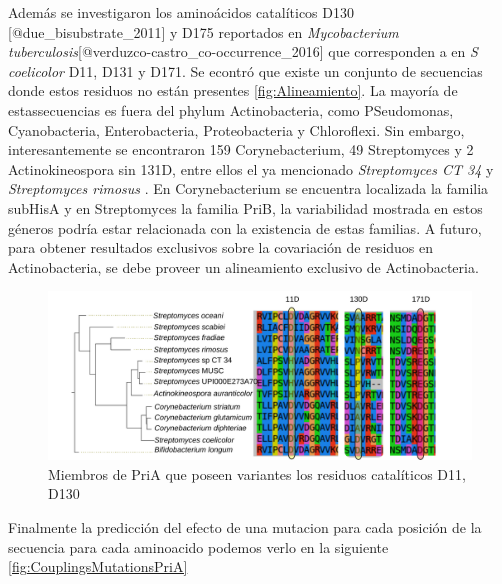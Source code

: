 \documentclass[]{article}
\begin{document}
{Además se investigaron los aminoácidos catalíticos D130
{[}@due\_bisubstrate\_2011{]} y D175 reportados en \emph{Mycobacterium
tuberculosis}{[}@verduzco-castro\_co-occurrence\_2016{]} que
corresponden a en \emph{S coelicolor} D11, D131 y D171. Se econtró que
existe un conjunto de secuencias donde estos residuos no están presentes
\autoref{fig:Alineamiento}. La mayoría de estassecuencias es fuera del
phylum Actinobacteria, como PSeudomonas, Cyanobacteria, Enterobacteria,
Proteobacteria y Chloroflexi. Sin embargo, interesantemente se
encontraron 159 Corynebacterium, 49 Streptomyces y 2 Actinokineospora
sin 131D, entre ellos el ya mencionado \emph{Streptomyces CT 34} y
\emph{Streptomyces rimosus} . En Corynebacterium se encuentra localizada
la familia subHisA y en Streptomyces la familia PriB, la variabilidad
mostrada en estos géneros podría estar relacionada con la existencia de
estas familias. A futuro, para obtener resultados exclusivos sobre la
covariación de residuos en Actinobacteria, se debe proveer un
alineamiento exclusivo de Actinobacteria.

\begin{figure}[h!tbp]
\centering
\includegraphics[angle = 0,scale = .5]{chapter4/Couplings/HIS4_STRCO_1-200/align/alineamiento.pdf}
\caption[Miembros de PriA que poseen variantes los residuos catalíticos D11, D130]{\footnotesize{Miembros de PriA que poseen variantes los residuos catalíticos D11, D130}}
\label{fig:Alineamiento}
\end{figure}

Finalmente la predicción del efecto de una mutacion para cada posición
de la secuencia para cada aminoacido podemos verlo en la siguiente
\autoref{fig:CouplingsMutationsPriA}

}
\end{document}
